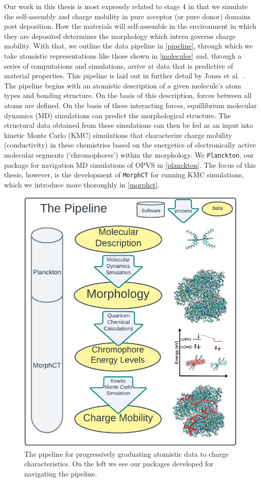 Our work in this thesis
is most expressly related to stage $4$ in that we simulate the self-assembly and
charge mobility in pure acceptor (or
pure donor) domains post deposition. 
How the materials will self-assemble in the environment in which they are deposited determines
the morphology which intern governs charge mobility. 
With that, we outline the data pipeline in \autoref{pipeline}, through which we take atomistic representations like
those shown in \autoref{molecules} and, through a series of computations and simulations,
arrive at data that is predictive of material properties. 
This pipeline is laid out in further detail by Jones et al.~\cite{jones2017}.
The pipeline begins with an atomistic description of a given molecule's atom types and bonding structure.
On the basis of this description, forces between all atoms are defined. On the basis of these interacting
forces, equillibrium molecular dynamics (MD) simulations can predict the morphological structure. 
The structural data obtained from these simulations can then be fed as an input into kinetic Monte
Carlo (KMC) simulations that characterize charge mobility (conductivity) in these chemistries based on the
energetics of electronically active molecular segments (`chromophores') within the morphology.
We \texttt{Planckton}, our package for navigation MD simulations of OPVS in \autoref{planckton}. 
The focus of this thesis, however, is the development of \texttt{MorphCT} for running KMC simulations, which we
introduce more thoroughly in \autoref{morphct}.

\begin{figure}
  \center
  \includegraphics[width=0.9\linewidth]{figures/the-pipeline.png} 
    \caption{The pipeline for progressively graduating atomistic data to charge characteristics. On the left
    we see our packages developed for navigating the pipeline.}
  \label{pipeline}
\end{figure}

